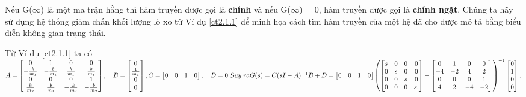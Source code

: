Nếu G($\infty$) là một ma trận hằng thì hàm truyền được gọi là \textbf{chính} và nếu G($\infty$) = 0, hàm truyền được gọi là \textbf{chính ngặt}.
Chúng ta hãy sử dụng hệ thống giảm chấn khối lượng lò xo từ Ví dụ \eqref{ct2.1.1} để minh họa cách tìm hàm truyền của một hệ đã cho được mô tả bằng biểu diễn không gian trạng thái.
\begin{example}
Từ Ví dụ \eqref{ct2.1.1} ta có
\begin{math}
A = \begin{bmatrix}
     0 & 1 & 0 & 0\\
     -\frac{k}{m_1} & -\frac{b}{m_1} & \frac{k}{m_1} & \frac{b}{m_1}\\
     0 & 0 & 0 & 1\\
     \frac{k}{m_2} & \frac{b}{m_2} & -\frac{k}{m_2} & -\frac{b}{m_2}
     \end{bmatrix},
\quad B = \begin{bmatrix}
     0 \\ \frac{1}{m_1} \\ 0 \\ 0
     \end{bmatrix},\\
     C = \begin{bmatrix}
     0 & 0 & 1 & 0 
     \end{bmatrix},
\quad D = 0.
\\
\\
\\
Suy \; ra \\
G(s) = C(sI - A)^{-1}B + D = \begin{bmatrix}
0 & 0 & 1 & 0
\end{bmatrix}
\begin{pmatrix}
\begin{bmatrix}
s & 0 & 0 & 0 \\
0 & s & 0 & 0 \\
0 & 0 & s & 0 \\
0 & 0 & 0 & s.
\end{bmatrix}
- 
\begin{bmatrix}
0 & 1 & 0 & 0\\
-4 & -2 & 4 & 2\\
0 & 0 & 0 & 1\\
4 & 2 & -4 & -2
\end{bmatrix}
\end{pmatrix}^{-1}
\begin{bmatrix}
0\\
1\\
0\\
0
\end{bmatrix}.
\end{math}
\end{example}

